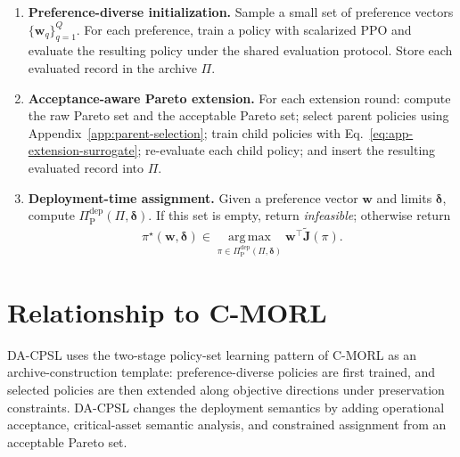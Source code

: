\documentclass[sigconf,review,anonymous]{acmart}
\begin{document}
\begin{enumerate}
\item \textbf{Preference-diverse initialization.} Sample a small set of
preference vectors \(\{\mathbf{w}_q\}_{q=1}^{Q}\). For each preference,
train a policy with scalarized PPO and evaluate the resulting policy
under the shared evaluation protocol. Store each evaluated record in the
archive \(\Pi\).

\item \textbf{Acceptance-aware Pareto extension.} For each extension
round: compute the raw Pareto set and the acceptable Pareto set; select
parent policies using Appendix~\ref{app:parent-selection}; train child
policies with Eq.~\ref{eq:app-extension-surrogate}; re-evaluate each
child policy; and insert the resulting evaluated record into \(\Pi\).

\item \textbf{Deployment-time assignment.} Given a preference vector
\(\mathbf{w}\) and limits \(\boldsymbol{\delta}\), compute
\(\Pi_{\mathrm{P}}^{\mathrm{dep}}(\Pi,\boldsymbol{\delta})\). If this set
is empty, return \emph{infeasible}; otherwise return
\begin{equation}
\begin{aligned}
 \pi^\star(\mathbf{w},\boldsymbol{\delta})
 \in
 \operatorname*{arg\,max}_{\pi\in
 \Pi_{\mathrm{P}}^{\mathrm{dep}}(\Pi,\boldsymbol{\delta})}
 \mathbf{w}^{\top}\widetilde{\mathbf{J}}(\pi).
\end{aligned}
\label{eq:app-assignment}
\end{equation}
\end{enumerate}

\section{Relationship to C-MORL}
\label{app:cmorl-relation}

DA-CPSL uses the two-stage policy-set learning pattern of C-MORL as an
archive-construction template: preference-diverse policies are first
trained, and selected policies are then extended along objective
directions under preservation constraints. DA-CPSL changes the deployment
semantics by adding operational acceptance, critical-asset semantic
analysis, and constrained assignment from an acceptable Pareto set.
\end{document}
